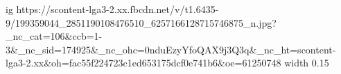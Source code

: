  
 
 
 
 

\par
\ifcmt
  ig https://scontent-lga3-2.xx.fbcdn.net/v/t1.6435-9/199359044_2851190108476510_6257166128715746875_n.jpg?_nc_cat=106&ccb=1-3&_nc_sid=174925&_nc_ohc=0nduEzyYfoQAX9j3Q3q&_nc_ht=scontent-lga3-2.xx&oh=fac55f224723c1ed653175dcf0e741b6&oe=61250748
  width 0.15
\fi

